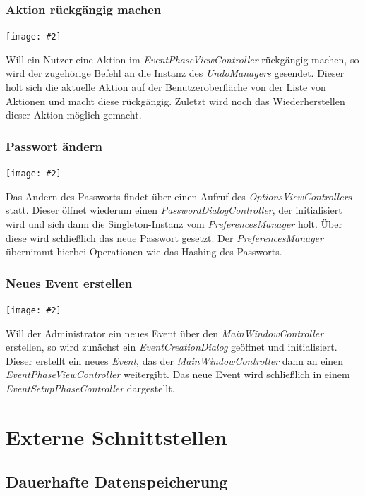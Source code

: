 \documentclass[11pt]{article}
\newcommand{\includediagram}[2]{
	\begin{center}
		\texttt{[image: \#2]}
	\end{center}
}
\begin{document}
\subsubsection{Aktion rückgängig machen}

\includediagram{1.0}{sequence-undo-action.png}

Will ein Nutzer eine Aktion im \textit{EventPhaseViewController} rückgängig machen, so wird der zugehörige Befehl an die Instanz des \textit{UndoManagers} gesendet. Dieser holt sich die aktuelle Aktion auf der Benutzeroberfläche von der Liste von Aktionen und macht diese rückgängig. Zuletzt wird noch das Wiederherstellen dieser Aktion möglich gemacht.

\subsubsection{Passwort ändern}

\includediagram{1.0}{sequence-change-password.png}

Das Ändern des Passworts findet über einen Aufruf des \textit{OptionsViewControllers} statt. Dieser öffnet wiederum einen \textit{PasswordDialogController}, der initialisiert wird und sich dann die Singleton-Instanz vom \textit{PreferencesManager} holt. Über diese wird schließlich das neue Passwort gesetzt. Der \textit{PreferencesManager} übernimmt hierbei Operationen wie das Hashing des Passworts.

\subsubsection{Neues Event erstellen}

\includediagram{1.0}{sequence-create-event.png}

Will der Administrator ein neues Event über den \textit{MainWindowController} erstellen, so wird zunächst ein \textit{EventCreationDialog} geöffnet und initialisiert. Dieser erstellt ein neues \textit{Event}, das der \textit{MainWindowController} dann an einen \textit{EventPhaseViewController} weitergibt. Das neue Event wird schließlich in einem \textit{EventSetupPhaseController} dargestellt.

\section{Externe Schnittstellen}

\subsection{Dauerhafte Datenspeicherung}
\end{document}
